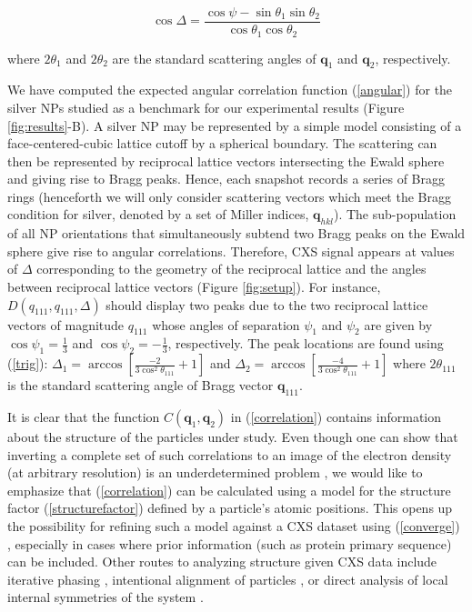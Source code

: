 \documentclass [11pt,fleqn]{article}
\def \be {\begin{equation}}
\def \ee {\end{equation}}
\begin{document}
\be\label{trig}
\cos \Delta = \frac{\cos \psi - \sin \theta_1 \sin \theta_2  }{ \cos \theta_1 \cos \theta_2} 
\ee

where $2 \theta_1$ and $2 \theta_2$ are the standard scattering angles of $\bm q_1$ and $\bm q_2$, respectively.

We have computed the expected angular correlation function (\ref{angular}) for the silver NPs studied as a benchmark for our experimental results (Figure \ref{fig:results}-B). A silver NP may be represented by a simple model consisting of a face-centered-cubic lattice cutoff by a spherical boundary. The scattering can then be represented by reciprocal lattice vectors intersecting the Ewald sphere and giving rise to Bragg peaks. Hence, each snapshot records a series of Bragg rings (henceforth we will only consider scattering vectors which meet the Bragg condition for silver, denoted by a set of Miller indices, $\bm q_{hkl}$). The sub-population of all NP orientations that simultaneously subtend two Bragg peaks on the Ewald sphere give rise to angular correlations. Therefore,  CXS signal appears at values of $\Delta $ corresponding to the geometry of the reciprocal lattice and the angles between reciprocal lattice vectors (Figure \ref{fig:setup}). For instance, $D (q_{111},q_{111}, \Delta  )$ should display two peaks due to the two reciprocal lattice vectors of magnitude $q_{111}$ whose angles of separation $\psi_1$ and $\psi_2$ are given by $\cos \psi_1 = \frac{1}{3}$ and $\cos \psi_2 = -\frac{1}{3} $, respectively. The peak locations are found using (\ref{trig}):   $\Delta_1 = \arccos[ \frac{-2}{3\cos^{2}\theta_{111}} + 1  ]$ and $\Delta_2 = \arccos[ \frac{-4}{3\cos^{2}\theta_{111}} + 1  ]$ where $2\theta_{111}$ is the standard scattering angle of Bragg vector $\bm q_{111}$.


It is clear that the function $C(\bm q_1, \bm q_2)$ in (\ref{correlation}) contains information about the structure of the particles under study. Even though one can show that inverting a complete set of such correlations to an image of the electron density (at arbitrary resolution) is an underdetermined problem \cite{Elser:2011ez}, we would like to emphasize that (\ref{correlation}) can be calculated using a model for the structure factor (\ref{structurefactor}) defined by a particle's atomic positions. This opens up the possibility for refining such a model against a CXS dataset using (\ref{converge}) \cite{Liu:2013dv, Chen:2013io, Saldin:2009jj}, especially in cases where prior information (such as protein primary sequence) can be included. Other routes to analyzing structure given CXS data include iterative phasing \cite{Saldin:2010bx}, intentional alignment of particles \cite{Poon:2013ia}, or direct analysis of local internal symmetries of the system \cite{Kurta:2012cb, Kurta:2013to}.
\end{document}
